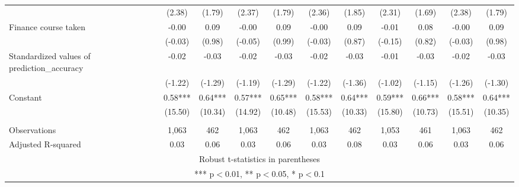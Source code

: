 \documentclass[]{article}
\begin{document}
\begin{tabular}{lcccccccccc}
 & (2.38) & (1.79) & (2.37) & (1.79) & (2.36) & (1.85) & (2.31) & (1.69) & (2.38) & (1.79) \\
Finance course taken & -0.00 & 0.09 & -0.00 & 0.09 & -0.00 & 0.09 & -0.01 & 0.08 & -0.00 & 0.09 \\
 & (-0.03) & (0.98) & (-0.05) & (0.99) & (-0.03) & (0.87) & (-0.15) & (0.82) & (-0.03) & (0.98) \\
Standardized values of prediction\_accuracy & -0.02 & -0.03 & -0.02 & -0.03 & -0.02 & -0.03 & -0.01 & -0.03 & -0.02 & -0.03 \\
 & (-1.22) & (-1.29) & (-1.19) & (-1.29) & (-1.22) & (-1.36) & (-1.02) & (-1.15) & (-1.26) & (-1.30) \\
Constant & 0.58*** & 0.64*** & 0.57*** & 0.65*** & 0.58*** & 0.64*** & 0.59*** & 0.66*** & 0.58*** & 0.64*** \\
 & (15.50) & (10.34) & (14.92) & (10.48) & (15.53) & (10.33) & (15.80) & (10.73) & (15.51) & (10.35) \\
 &  &  &  &  &  &  &  &  &  &  \\
Observations & 1,063 & 462 & 1,063 & 462 & 1,063 & 462 & 1,053 & 461 & 1,063 & 462 \\
 Adjusted R-squared & 0.03 & 0.06 & 0.03 & 0.06 & 0.03 & 0.08 & 0.03 & 0.06 & 0.03 & 0.06 \\ \hline
\multicolumn{11}{c}{ Robust t-statistics in parentheses} \\
\multicolumn{11}{c}{ *** p$<$0.01, ** p$<$0.05, * p$<$0.1} \\
\end{tabular}
\end{document}
